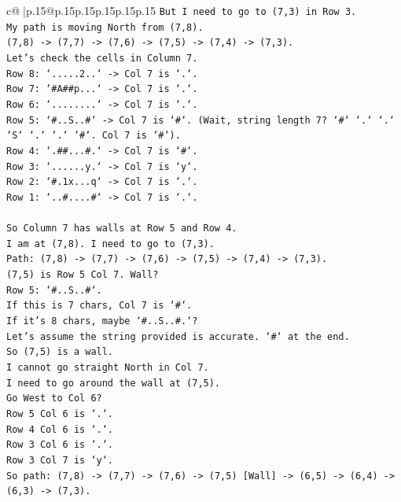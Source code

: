 \documentclass{article}
\begin{document}
{\begin{supertabular}{c@{$\;$}|p{.15\linewidth}@{}p{.15\linewidth}p{.15\linewidth}p{.15\linewidth}p{.15\linewidth}p{.15\linewidth}}
{{{\texttt{But I need to go to (7,3) in Row 3.} \\
\texttt{My path is moving North from (7,8).} \\
\texttt{(7,8) {-}> (7,7) {-}> (7,6) {-}> (7,5) {-}> (7,4) {-}> (7,3).} \\
\texttt{Let's check the cells in Column 7.} \\
\texttt{Row 8: `.....2..` {-}> Col 7 is `.`.} \\
\texttt{Row 7: `\#A\#\#p...` {-}> Col 7 is `.`.} \\
\texttt{Row 6: `........` {-}> Col 7 is `.`.} \\
\texttt{Row 5: `\#..S..\#` {-}> Col 7 is `\#`. (Wait, string length 7? `\#` `.` `.` `S` `.` `.` `\#`. Col 7 is `\#`).} \\
\texttt{Row 4: `.\#\#...\#.` {-}> Col 7 is `\#`.} \\
\texttt{Row 3: `......y.` {-}> Col 7 is `y`.} \\
\texttt{Row 2: `\#.1x...q` {-}> Col 7 is `.`.} \\
\texttt{Row 1: `..\#....\#` {-}> Col 7 is `.`.} \\
\\ 
\texttt{So Column 7 has walls at Row 5 and Row 4.} \\
\texttt{I am at (7,8). I need to go to (7,3).} \\
\texttt{Path: (7,8) {-}> (7,7) {-}> (7,6) {-}> (7,5) {-}> (7,4) {-}> (7,3).} \\
\texttt{(7,5) is Row 5 Col 7. Wall?} \\
\texttt{Row 5: `\#..S..\#`.} \\
\texttt{If this is 7 chars, Col 7 is `\#`.} \\
\texttt{If it's 8 chars, maybe `\#..S..\#.`?} \\
\texttt{Let's assume the string provided is accurate. `\#` at the end.} \\
\texttt{So (7,5) is a wall.} \\
\texttt{I cannot go straight North in Col 7.} \\
\texttt{I need to go around the wall at (7,5).} \\
\texttt{Go West to Col 6?} \\
\texttt{Row 5 Col 6 is `.`.} \\
\texttt{Row 4 Col 6 is `.`.} \\
\texttt{Row 3 Col 6 is `.`.} \\
\texttt{Row 3 Col 7 is `y`.} \\
\texttt{So path: (7,8) {-}> (7,7) {-}> (7,6) {-}> (7,5) {[}Wall{]} {-}> (6,5) {-}> (6,4) {-}> (6,3) {-}> (7,3).} \\
}}}
\end{supertabular}}
\end{document}
